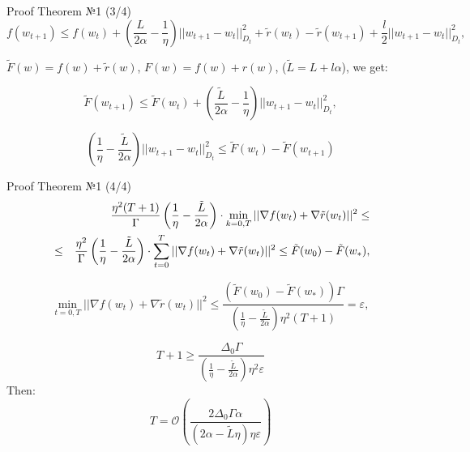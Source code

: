 \documentclass[aspectratio=169, 12pt]{beamer}
\begin{document}
\begin{frame}{Proof Theorem №1 (3/4)}
    \begin{equation*}
    f(w_{t+1}) \leq f(w_t) + \left( \frac{L}{2\alpha} - \frac{1}{\eta} \right) ||w_{t+1} - w_t||_{D_t}^2 + \tilde{r}(w_t) - \tilde{r}(w_{t+1}) + \frac{l}{2}||w_{t+1}-w_t||_{D_t}^2,
\end{equation*}

$\tilde{F}(w) = f(w) + \tilde{r}(w)$, $F(w) = f(w) + r(w)$, ($\tilde{L}=L + l \alpha$), we get:

\begin{equation*}
    \tilde{F}(w_{t+1}) \leq \tilde{F}(w_t) + \left( \frac{\tilde{L}}{2\alpha} - \frac{1}{\eta}  \right) ||w_{t+1} - w_t||_{D_t}^2,
\end{equation*}


\begin{equation*}
    \left(\frac{1}{\eta} - \frac{\tilde{L}}{2\alpha}   \right) ||w_{t+1} - w_t||_{D_t}^2 \leq \tilde{F}(w_t) - \tilde{F}(w_{t+1})
\end{equation*}
\end{frame}

\begin{frame}{Proof Theorem №1 (4/4)}
\begin{eqnarray*}
&& \frac{\eta^2  (T+1)}{\Gamma}\left(\frac{1}{\eta} - \frac{\tilde{L}}{2\alpha}   \right)\cdot\min_{k = 0, T} ||\nabla f(w_t) + \nabla \tilde{r}(w_t)||^2 \leq
\notag\\&\leq&
\frac{\eta^2}{\Gamma}\left(\frac{1}{\eta} - \frac{\tilde{L}}{2\alpha}   \right)\cdot\sum\limits_{t = 0}^T ||\nabla f(w_t) + \nabla \tilde{r}(w_t)||^2 \leq \tilde{F}(w_0) - \tilde{F}(w_*),    
\end{eqnarray*}

\begin{equation*}
    \min_{t = 0, T} ||\nabla f(w_t) + \nabla \tilde{r}(w_t)||^2 \leq \frac{(\tilde{F}(w_0) - \tilde{F}(w_*))\Gamma}{(\frac{1}{\eta} - \frac{\tilde{L}}{2\alpha}) \eta^2 (T+1)} = \varepsilon,
\end{equation*}

\begin{equation*}
    T + 1 \geq \frac{\Delta_0 \Gamma}{(\frac{1}{\eta} - \frac{\tilde{L}}{2\alpha}) \eta^2 \varepsilon}
\end{equation*}
    Then:
\begin{equation*}
      T = \mathcal{O}\left( \frac{2\Delta_0 \Gamma \alpha } {(2\alpha - \tilde{L}\eta) \eta \varepsilon} \right)
\end{equation*}
\end{frame}
\end{document}
